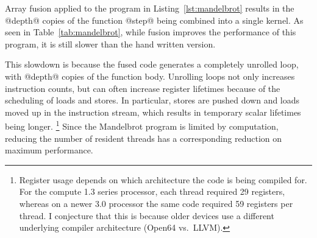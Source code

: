 
Array fusion applied to the program in Listing~\ref{lst:mandelbrot} results in
the @depth@ copies of the function @step@ being combined into a single kernel.
As seen in Table~\ref{tab:mandelbrot}, while fusion improves the performance of
this program, it is still slower than the hand written version.

This slowdown is because the fused code generates a completely unrolled loop,
with @depth@ copies of the function body. Unrolling loops not only increases
instruction counts, but can often increase register lifetimes because of the
scheduling of loads and stores. In particular, stores are pushed down and loads
moved up in the instruction stream, which results in temporary scalar lifetimes
being longer.%
\footnote{\label{ft:fixed_unrolling}Register usage depends on which architecture
the code is being compiled for. For the compute 1.3 series processor, each
thread required 29 registers, whereas on a newer 3.0 processor the same code
required 59 registers per thread. I conjecture that this is because older
devices use a different underlying compiler architecture (Open64 vs.\ LLVM).}
Since the Mandelbrot program is limited by computation, reducing the number of
resident threads has a corresponding reduction on maximum performance.

